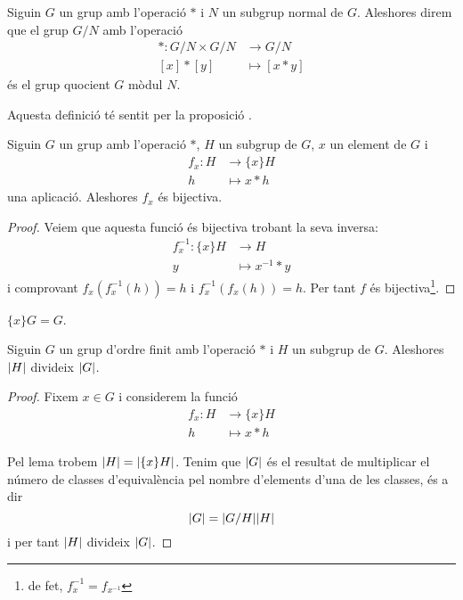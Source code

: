 \documentclass[../Apunts.tex]{subfiles}
\begin{document}
	\begin{definition}
		\label{def:grup quocient}\label{def:relació d'equivalència entre grups}\label{def:producte entre classes versió grups}
		Siguin \(G\) un grup amb l'operació \(\ast\) i \(N\) un subgrup normal de \(G\). Aleshores direm que el grup \(G/N\) amb l'operació
		\begin{align*}
		\ast\colon G/N\times G/N&\longrightarrow G/N\\
		[x]\ast[y]&\longmapsto[x\ast y]
		\end{align*}
		és el grup quocient \(G\) mòdul \(N\).
		
		Aquesta definició té sentit per la proposició .
	\end{definition}
	\begin{lemma}
		\label{lema:operar en grups és bijectiu}
		Siguin \(G\) un grup amb l'operació \(\ast\), \(H\) un subgrup de \(G\), \(x\) un element de \(G\) i
		\begin{align*}
		f_{x}\colon H&\longrightarrow\{x\}H\\
		h&\longmapsto x\ast h
		\end{align*}
		una aplicació. Aleshores \(f_{x}\) és bijectiva.
		\begin{proof}
			Veiem que aquesta funció és bijectiva trobant la seva inversa:
			\begin{align*}
			f_{x}^{-1}\colon\{x\}H&\longrightarrow H\\
			y&\longmapsto x^{-1}\ast y
			\end{align*}
			i comprovant \(f_{x}(f_{x}^{-1}(h))=h\) i \(f_{x}^{-1}(f_{x}(h))=h\). Per tant \(f\) és bijectiva\footnote{de fet, \(f_{x}^{-1}=f_{x^{-1}}\)}. %
		\end{proof}
	\end{lemma}
	\begin{observation}
		\(\{x\}G=G\).
	\end{observation}
	\begin{theorem}
		\label{thm:Teorema de Lagrange}
		Siguin \(G\) un grup d'ordre finit amb l'operació \(\ast\) i \(H\) un subgrup de \(G\). Aleshores \(\abs{H}\) divideix \(\abs{G}\).
		\begin{proof}
			Fixem \(x\in G\) i considerem la funció
			\begin{align*}
			f_{x}\colon H&\longrightarrow\{x\}H\\
			h&\longmapsto x\ast h
			\end{align*}
			
			Pel lema  trobem \(\abs{H}=\abs{\{x\}H}\). Tenim que \(\abs{G}\) és el resultat de multiplicar el número de classes d'equivalència pel nombre d'elements d'una de les classes, és a dir %
			\[\abs{G}=\abs{G/H}\abs{H}\]
			i per tant \(\abs{H}\) divideix \(\abs{G}\).
		\end{proof}
	\end{theorem}
\end{document}
